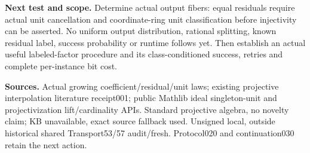 \documentclass[11pt]{article}
\begin{document}
\textbf{Next test and scope.}
Determine actual output fibers: equal residuals require actual unit
cancellation and coordinate-ring unit classification before injectivity can
be asserted. No uniform output distribution, rational splitting, known
residual label, success probability or runtime follows yet. Then establish
an actual useful labeled-factor procedure and its class-conditioned
success, retries and complete per-instance bit cost.

\textbf{Sources.}
Actual growing coefficient/residual/unit laws; existing projective
interpolation literature receipt001; public Mathlib ideal singleton-unit
and projectivization lift/cardinality APIs. Standard projective algebra,
no novelty claim; KB unavailable, exact source fallback used. Unsigned
local, outside historical shared Transport53/57 audit/fresh.
Protocol020 and continuation030 retain the next action.
\end{document}
